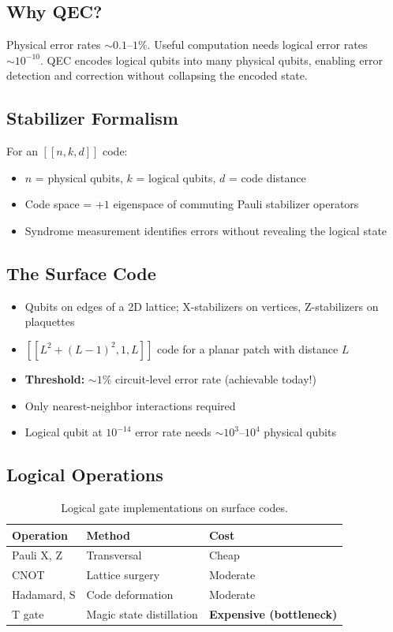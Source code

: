\documentclass[11pt,a4paper]{article}
\begin{document}
\subsection{Why QEC?}

Physical error rates $\sim 0.1$--$1\%$. Useful computation needs logical error rates $\sim 10^{-10}$. QEC encodes logical qubits into many physical qubits, enabling error detection and correction without collapsing the encoded state.

\subsection{Stabilizer Formalism}

For an $[[n, k, d]]$ code:
\begin{itemize}
    \item $n$ = physical qubits, $k$ = logical qubits, $d$ = code distance
    \item Code space = $+1$ eigenspace of commuting Pauli stabilizer operators
    \item Syndrome measurement identifies errors without revealing the logical state
\end{itemize}

\subsection{The Surface Code}

\begin{itemize}
    \item Qubits on edges of a 2D lattice; X-stabilizers on vertices, Z-stabilizers on plaquettes
    \item $[[L^2 + (L-1)^2, 1, L]]$ code for a planar patch with distance $L$
    \item \textbf{Threshold:} $\sim 1\%$ circuit-level error rate (achievable today!)
    \item Only nearest-neighbor interactions required
    \item Logical qubit at $10^{-14}$ error rate needs $\sim 10^3$--$10^4$ physical qubits
\end{itemize}

\subsection{Logical Operations}

\begin{table}[H]
\centering
\begin{tabular}{lll}
\toprule
\textbf{Operation} & \textbf{Method} & \textbf{Cost} \\
\midrule
Pauli X, Z & Transversal & Cheap \\
CNOT & Lattice surgery & Moderate \\
Hadamard, S & Code deformation & Moderate \\
T gate & Magic state distillation & \textbf{Expensive (bottleneck)} \\
\bottomrule
\end{tabular}
\caption{Logical gate implementations on surface codes.}
\end{table}
\end{document}
